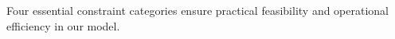 





Four essential constraint categories ensure practical feasibility and operational efficiency in our model. 

